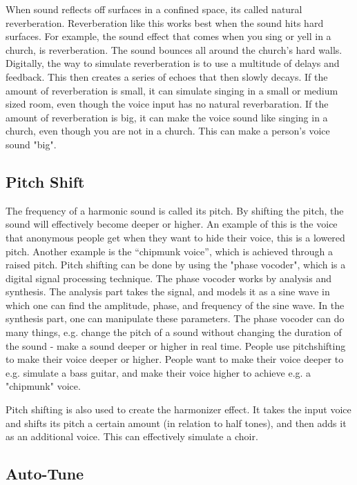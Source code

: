 When sound reflects off surfaces in a confined space, its called natural reverberation\citep{Redmon_1997}. Reverberation like this works best when the sound hits hard surfaces. For example, the sound effect that comes when you sing or yell in a church, is reverberation. The sound bounces all around the church's hard walls.
Digitally, the way to simulate reverberation is to use a multitude of delays and feedback. This then creates a series of echoes that then slowly decays. 
If the amount of reverberation is small, it can simulate singing in a small or medium sized room, even though the voice input has no natural reverbaration. If the amount of reverberation is big, it can make the voice sound like singing in a church, even though you are not in a church. This can make a person's voice sound "big".

\subsection{Pitch Shift}

The frequency of a harmonic sound is called its pitch\citep{Katjaas_00}. By shifting the pitch, the sound will effectively become deeper or higher. An example of this is the voice that anonymous people get when they want to hide their voice, this is a lowered pitch. Another example is the “chipmunk voice”, which is achieved through a raised pitch.
Pitch shifting can be done by using the "phase vocoder", which is a digital signal processing technique\citep{dolson}. The phase vocoder works by analysis and synthesis. The analysis part takes the signal, and models it as a sine wave in which one can find the amplitude, phase, and frequency of the sine wave. In the synthesis part, one can manipulate these parameters. 
The phase vocoder can do many things, e.g. change the pitch of a sound without changing the duration of the sound - make a sound deeper or higher in real time. 
People use pitchshifting to make their voice deeper or higher. People want to make their voice deeper to e.g. simulate a bass guitar, and make their voice higher to achieve e.g. a "chipmunk" voice.

Pitch shifting is also used to create the harmonizer effect. It takes the input voice and shifts its pitch a certain amount (in relation to half tones), and then adds it as an additional voice. This can effectively simulate a choir.

\subsection{Auto-Tune}

